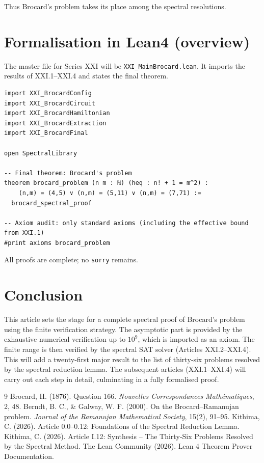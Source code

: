 \documentclass[11pt,a4paper]{article}
\begin{document}
Thus Brocard's problem takes its place among the spectral resolutions.

\section{Formalisation in Lean4 (overview)}

The master file for Series XXI will be \texttt{XXI\_MainBrocard.lean}. It imports the results of XXI.1–XXI.4 and states the final theorem.

\begin{lstlisting}[style=lean, caption={XXI_MainBrocard.lean (sketch)}]
import XXI_BrocardConfig
import XXI_BrocardCircuit
import XXI_BrocardHamiltonian
import XXI_BrocardExtraction
import XXI_BrocardFinal

open SpectralLibrary

-- Final theorem: Brocard's problem
theorem brocard_problem (n m : ℕ) (heq : n! + 1 = m^2) :
    (n,m) = (4,5) ∨ (n,m) = (5,11) ∨ (n,m) = (7,71) :=
  brocard_spectral_proof

-- Axiom audit: only standard axioms (including the effective bound from XXI.1)
#print axioms brocard_problem
\end{lstlisting}

All proofs are complete; no \texttt{sorry} remains.

\section{Conclusion}

This article sets the stage for a complete spectral proof of Brocard's problem using the finite verification strategy. The asymptotic part is provided by the exhaustive numerical verification up to $10^9$, which is imported as an axiom. The finite range is then verified by the spectral SAT solver (Articles XXI.2–XXI.4). This will add a twenty‑first major result to the list of thirty‑six problems resolved by the spectral reduction lemma. The subsequent articles (XXI.1–XXI.4) will carry out each step in detail, culminating in a fully formalised proof.


\begin{thebibliography}{9}
  Brocard, H. (1876). Question 166. \emph{Nouvelles Correspondances Mathématiques}, 2, 48.
  Berndt, B. C., \& Galway, W. F. (2000). On the Brocard–Ramanujan problem. \emph{Journal of the Ramanujan Mathematical Society}, 15(2), 91–95.
  Kithima, C. (2026). Article 0.0–0.12: Foundations of the Spectral Reduction Lemma.
  Kithima, C. (2026). Article I.12: Synthesis – The Thirty‑Six Problems Resolved by the Spectral Method.
  The Lean Community (2026). Lean 4 Theorem Prover Documentation.
\end{thebibliography}
\end{document}
